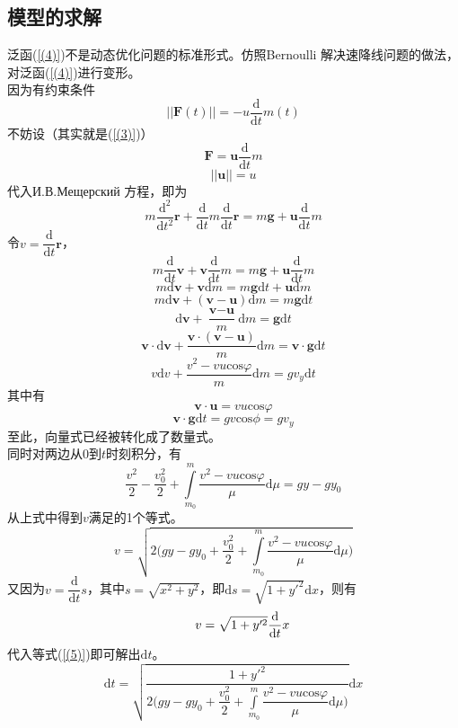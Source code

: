 \documentclass[UTF8]{article}
\begin{document}
\subsection{模型的求解}
泛函(\ref{(4)})不是动态优化问题的标准形式。仿照Bernoulli 解决速降线问题的做法，对泛函(\ref{(4)})进行变形。\\
\indent 因为有约束条件
\[||\textbf{F}(t)||=-u\dfrac{\textrm{d}}{\textrm{d}t}m(t)\]
\indent 不妨设（其实就是(\ref{(3)})）
\[\textbf{F}=\textbf{u}\dfrac{\textrm{d}}{\textrm{d}t}m\]
\[||\textbf{u}||=u\]
\indent 代入И.В.Мещерский 方程，即为
\[m\dfrac{\textrm{d}^2}{\textrm{d}t^2}\textbf{r}+\dfrac{\textrm{d}}{\textrm{d}t}m\dfrac{\textrm{d}}{\textrm{d}t}\textbf{r}=m\textbf{g}+\textbf{u}\dfrac{\textrm{d}}{\textrm{d}t}m\]
\indent 令\(v=\dfrac{\textrm{d}}{\textrm{d}t}\textbf{r}\)，
\[m\dfrac{\textrm{d}}{\textrm{d}t}\textbf{v}+\textbf{v}\dfrac{\textrm{d}}{\textrm{d}t}m=m\textbf{g}+\textbf{u}\dfrac{\textrm{d}}{\textrm{d}t}m\]
\[m\textrm{d}\textbf{v}+\textbf{v}\textrm{d}m=m\textbf{g}\textrm{d}t+\textbf{u}\textrm{d}m\]
\[m\textrm{d}\textbf{v}+(\textbf{v}-\textbf{u})\textrm{d}m=m\textbf{g}\textrm{d}t\]
\[\textrm{d}\textbf{v}+\frac{\textbf{v}-\textbf{u}}{m}\textrm{d}m=\textbf{g}\textrm{d}t\]
\[\textbf{v}\cdot\textrm{d}\textbf{v}+\frac{\textbf{v}\cdot(\textbf{v}-\textbf{u})}{m}\textrm{d}m=\textbf{v}\cdot\textbf{g}\textrm{d}t\]
\[v\textrm{d}v+\frac{v^2-vu\textrm{cos}\varphi}{m}\textrm{d}m=gv_y\textrm{d}t\]
\indent 其中有
\[\textbf{v}\cdot\textbf{u}=vu\textrm{cos}\varphi\]
\[\textbf{v}\cdot\textbf{g}\textrm{d}t=gv\textrm{cos}\phi=gv_y\]
\indent 至此，向量式已经被转化成了数量式。\\
\indent 同时对两边从0到\(t\)时刻积分，有
\begin{equation}
\frac{v^2}{2}-\frac{v_0^2}{2}+\int\limits_{m_0}^m\frac{v^2-vu\textrm{cos}\varphi}{\mu}\textrm{d}\mu=gy-gy_0\label{(5)}
\end{equation}
\indent 从上式中得到\(v\)满足的1个等式。
\[v=\sqrt{2\Big(gy-gy_0+\dfrac{v_0^2}{2}+\int\limits_{m_0}^m\frac{v^2-vu\textrm{cos}\varphi}{\mu}\textrm{d}\mu\Big)}\]
\indent 又因为\(v=\dfrac{\textrm{d}}{\textrm{d}t}s\)，其中\(s=\sqrt{x^2+y^2}\)，即\(\textrm{d}s=\sqrt{1+y'^2}\textrm{d}x\)，则有
\begin{equation}
\indent v=\sqrt{1+y'^2}\dfrac{\textrm{d}}{\textrm{d}t}x\label{(6)}
\end{equation}
\indent 代入等式(\ref{(5)})即可解出\(\textrm{d}t\)。
\begin{equation}
\textrm{d}t=\sqrt{\dfrac{1+y'^2}{2\Big(gy-gy_0+\dfrac{v_0^2}{2}+\int\limits_{m_0}^m\dfrac{v^2-vu\textrm{cos}\varphi}{\mu}\textrm{d}\mu\Big)}}\textrm{d}x\label{(7)}
\end{equation}
\end{document}

